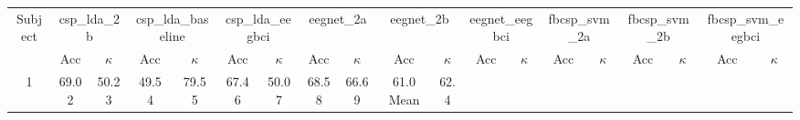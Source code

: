 \begin{tabular}{ccccccccccccccccccc}
\toprule
Subject & \multicolumn{2}{c}{csp_lda_2b} & \multicolumn{2}{c}{csp_lda_baseline} & \multicolumn{2}{c}{csp_lda_eegbci} & \multicolumn{2}{c}{eegnet_2a} & \multicolumn{2}{c}{eegnet_2b} & \multicolumn{2}{c}{eegnet_eegbci} & \multicolumn{2}{c}{fbcsp_svm_2a} & \multicolumn{2}{c}{fbcsp_svm_2b} & \multicolumn{2}{c}{fbcsp_svm_eegbci} \\
\cmidrule(lr){2-3}\cmidrule(lr){4-5}\cmidrule(lr){6-7}
 & Acc & $\kappa$ & Acc & $\kappa$ & Acc & $\kappa$ & Acc & $\kappa$ & Acc & $\kappa$ & Acc & $\kappa$ & Acc & $\kappa$ & Acc & $\kappa$ & Acc & $\kappa$ \\
\midrule
1 & 69.0%
2 & 50.2%
3 & 49.5%
4 & 79.5%
5 & 67.4%
6 & 50.0%
7 & 68.5%
8 & 66.6%
9 & 61.0%
\midrule
Mean & 62.4%
\bottomrule
\end{tabular}